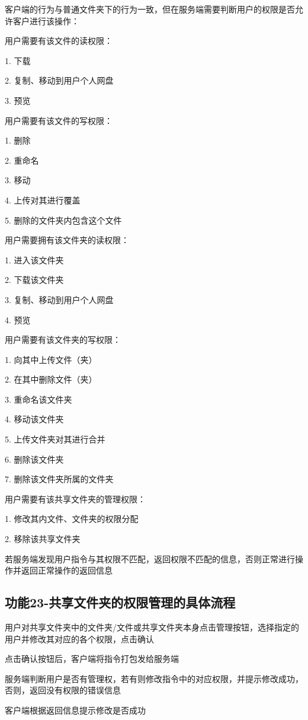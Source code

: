 客户端的行为与普通文件夹下的行为一致，但在服务端需要判断用户的权限是否允许客户进行该操作：

用户需要有该文件的读权限：

1. 下载

2. 复制、移动到用户个人网盘

3. 预览

用户需要有该文件的写权限：

1. 删除

2. 重命名

3. 移动

4. 上传对其进行覆盖

5. 删除的文件夹内包含这个文件

用户需要拥有该文件夹的读权限：

1. 进入该文件夹

2. 下载该文件夹

3. 复制、移动到用户个人网盘

4. 预览

用户需要有该文件夹的写权限：

1. 向其中上传文件（夹）

2. 在其中删除文件（夹）

3. 重命名该文件夹

4. 移动该文件夹

5. 上传文件夹对其进行合并

6. 删除该文件夹

7. 删除该文件夹所属的文件夹

用户需要有该共享文件夹的管理权限：

1. 修改其内文件、文件夹的权限分配

2. 移除该共享文件夹

若服务端发现用户指令与其权限不匹配，返回权限不匹配的信息，否则正常进行操作并返回正常操作的返回信息

\subsection{功能23-共享文件夹的权限管理的具体流程}

用户对共享文件夹中的文件夹/文件或共享文件夹本身点击管理按钮，选择指定的用户并修改其对应的各个权限，点击确认

点击确认按钮后，客户端将指令打包发给服务端

服务端判断用户是否有管理权，若有则修改指令中的对应权限，并提示修改成功，否则，返回没有权限的错误信息

客户端根据返回信息提示修改是否成功



